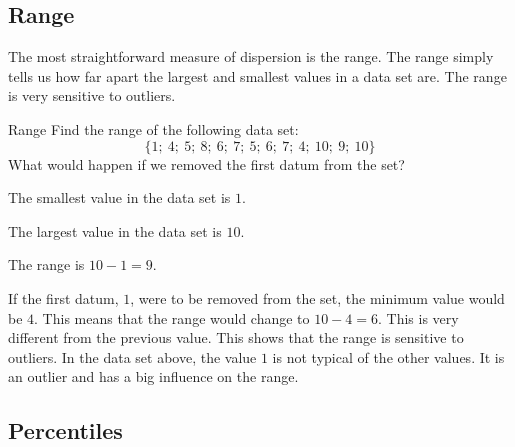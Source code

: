 \subsection{Range}

The most straightforward measure of dispersion is the range. The range
simply tells us how far apart the largest and smallest values in a
data set are. The range is very sensitive to outliers.

\begin{wex}{Range}
{Find the range of the following data set:
    \begin{equation*}
      \{1;\ 4;\ 5;\ 8;\ 6;\ 7;\ 5;\ 6;\ 7;\ 4;\ 10;\ 9;\ 10\}
    \end{equation*}
    What would happen if we removed the first datum from the set?
}{
  The smallest value in the data set is $1$.

  The largest value in the data set is $10$.

  The range is $10-1=9$.

  If the first datum, $1$, were to be removed from the set, the
  minimum value would be $4$. This means that the range would change
  to $10-4=6$. This is very different from the previous value. This
  shows that the range is sensitive to outliers. In the data set
  above, the value $1$ is not typical of the other values. It is an
  outlier and has a big influence on the range.
}
\end{wex}


\subsection{Percentiles}


